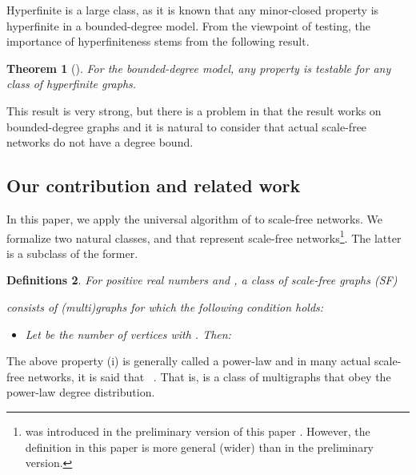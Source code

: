 \documentclass[11pt]{article}
\newtheorem{thm}{Theorem}[section]
\newtheorem{df}[thm]{Definitions}
\begin{document}
Hyperfinite is a large class, as it is known that any minor-closed property is hyperfinite
in a bounded-degree model. From the viewpoint of testing, the importance of hyperfiniteness stems from the following result. 



\begin{thm}[\cite{NS_Testable_SJCOMP13}]
For the bounded-degree model, any property is testable for any class of hyperfinite graphs. 
\end{thm}






This result is very strong, but there is a problem in that the result works on bounded-degree graphs and it is natural to consider that actual scale-free networks do not have a degree bound.  



\subsection{Our contribution and related work}

In this paper, we apply the universal algorithm of \cite{NS_Testable_SJCOMP13} to scale-free networks. 
We formalize two natural classes, 
 and 
that represent scale-free networks\footnote{
 was introduced in the preliminary version of this paper \cite{ScalefreeTest_itohiro15_arXiv}. 
However, the definition in this paper is more general (wider) than in the preliminary version. 
}. 
The latter is a subclass of the former. 






\begin{df}\label{df:DSF}
For positive real numbers  and , 
a class of {\em scale-free graphs (SF)} 

consists of (multi)graphs  for which the following condition holds: 
\begin{itemize}
\item[(i)] Let  be the number of vertices  with . Then: 

\end{itemize}
\end{df}



The above property (i) is generally called a power-law and in many actual scale-free networks, it is said that ~\cite{AlbertBarabasi_SF_02}. 
That is,  is a class of multigraphs that obey the power-law degree distribution. 
\end{document}
